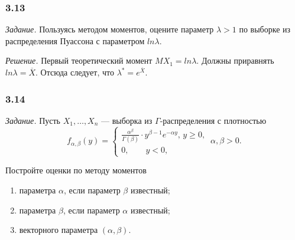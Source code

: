 \subsubsection*{3.13}

\textit{Задание.}
Пользуясь методом моментов,
оцените параметр $ \lambda > 1$ по выборке из распределения Пуассона с параметром $ln \lambda $.

\textit{Решение.} Первый теоретический момент $MX_1 = ln \lambda $.
Должны приравнять $ln \lambda = \overline{X}$.
Отсюда следует, что $ \lambda^* = e^{ \overline{X}}$.

\subsubsection*{3.14}

\textit{Задание.} Пусть $X_1, \dotsc, X_n$ --- выборка из $ \Gamma $-распределения с плотностью
$$f_{ \alpha, \beta } \left( y \right) =
  \begin{cases}
    \frac{ \alpha^{ \beta }}{ \Gamma \left( \beta \right) } \cdot y^{ \beta - 1} e^{- \alpha y}, \,
    y \geq 0, \\
    0, \qquad y < 0,
  \end{cases} \,
  \alpha, \beta > 0.$$

Постройте оценки по методу моментов
\begin{enumerate}[label=\alph*)]
  \item параметра $ \alpha $, если параметр $ \beta $ известный;
  \item параметра $ \beta $, если параметр $ \alpha $ известный;
  \item векторного параметра $ \left( \alpha, \beta \right) $.
\end{enumerate}

